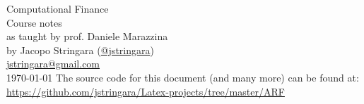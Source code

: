 \begin{titlepage}
    \begin{center}
        \vspace*{\fill}
        \Huge
        Computational Finance\\
        \vspace{0.5em}
        \Large
        Course notes\\
        as taught by prof. Daniele Marazzina \\
        \vspace{0.5em}
        by Jacopo Stringara (\href{https://github.com/jstringara}{@jstringara})\\
        \vspace{0.5em}
        \href{mailto:jstringara@gmail.com}{jstringara@gmail.com} \\
        \vspace{0.5em}
        \today
        \vfill
        The source code for this document (and many more) can be found at:\\
        \href{https://github.com/jstringara/Latex-projects/tree/master/ARF}{https://github.com/jstringara/Latex-projects/tree/master/ARF}
    \end{center}
\end{titlepage}

